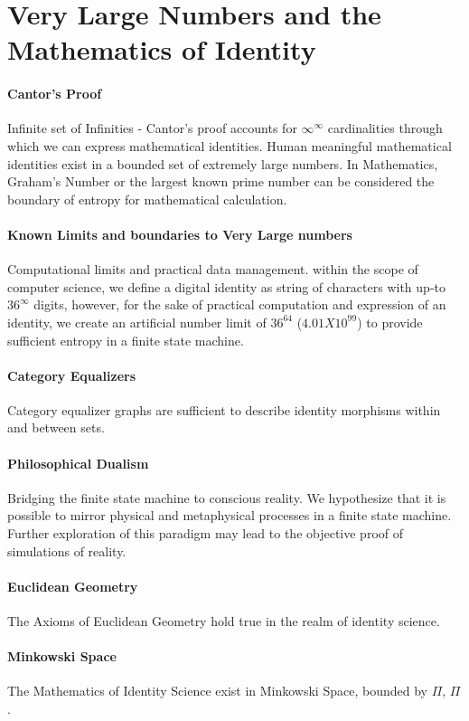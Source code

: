 \documentclass{article}
\begin{document}
\section{Very Large Numbers and the Mathematics of Identity}
		\paragraph{Cantor's Proof} Infinite set of Infinities - Cantor's proof accounts for $\infty^\infty$ cardinalities through which we can express mathematical identities.  Human meaningful mathematical identities exist in a bounded set of extremely large numbers.  In Mathematics, Graham's Number or the largest known prime number can be considered the boundary of entropy for mathematical calculation. 
		\paragraph{Known Limits and boundaries to Very Large numbers} Computational limits and practical data management.  within the scope of computer science, we define a digital identity as string of characters with up-to $36^\infty$ digits, however, for the sake of practical computation and expression of an identity, we create an artificial number limit of $36^{64}$ ($4.01 X10^{99}$) to provide sufficient entropy in a finite state machine.   
		\paragraph{Category Equalizers} Category equalizer graphs are sufficient to describe identity morphisms within and between sets.
		\paragraph{Philosophical Dualism} Bridging the finite state machine to conscious reality.  We hypothesize that it is possible to mirror physical and metaphysical processes in a finite state machine.  Further exploration of this paradigm may lead to the objective proof of simulations of reality.
		\paragraph{Euclidean Geometry} The Axioms of Euclidean Geometry hold true in the realm of identity science.
		\paragraph{Minkowski Space} The Mathematics of Identity Science exist in Minkowski Space, bounded by $\Pi$, $\Pi$.
\end{document}
